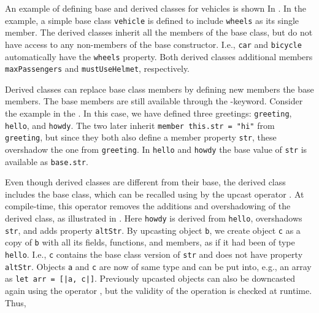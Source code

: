 \documentclass[fsharpNotes.tex]{subfiles}
\begin{document}
An example of defining base and derived classes for vehicles is shown In .
%
%
In the example, a simple base class \lstinline{vehicle} is defined to include \lstinline{wheels} as its single member. The derived classes inherit all the members of the base class, but do not have access to any non-members of the base constructor. I.e., \lstinline{car} and \lstinline{bicycle} automatically have the \lstinline{wheels} property. Both derived classes additional members \lstinline{maxPassengers} and \lstinline{mustUseHelmet}, respectively.

Derived classes can replace base class members by defining new members  the base members. The base members are still available through the -keyword. Consider the example in the .
%
%
In this case, we have defined three greetings: \lstinline{greeting}, \lstinline{hello}, and \lstinline{howdy}. The two later inherit \lstinline{member this.str = "hi"} from \lstinline{greeting}, but since they both also define a member property \lstinline{str}, these overshadow the one from \lstinline{greeting}. In \lstinline{hello} and \lstinline{howdy} the base value of \lstinline{str} is available as \lstinline{base.str}.

Even though derived classes are different from their base, the derived class includes the base class, which can be recalled using  by the upcast operator \idx[:>@\lstinline{:>}]{\lexeme{:>}}. At compile-time, this operator removes the additions and overshadowing of the derived class, as illustrated in . 
%
%
Here \lstinline{howdy} is derived from \lstinline{hello}, overshadows \lstinline{str}, and adds property \lstinline{altStr}. By upcasting object \lstinline{b}, we create object \lstinline{c} as a copy of \lstinline{b} with all its fields, functions, and members, as if it had been of type \lstinline{hello}. I.e., \lstinline{c} contains the base class version of \lstinline{str} and does not have property \lstinline{altStr}. Objects \lstinline{a} and \lstinline{c} are now of same type and can be put into, e.g., an array as \lstinline{let arr = [|a, c|]}. Previously upcasted objects can also be downcasted again using the  operator , but the validity of the operation is checked at runtime. Thus, 
\clearpage
\end{document}
